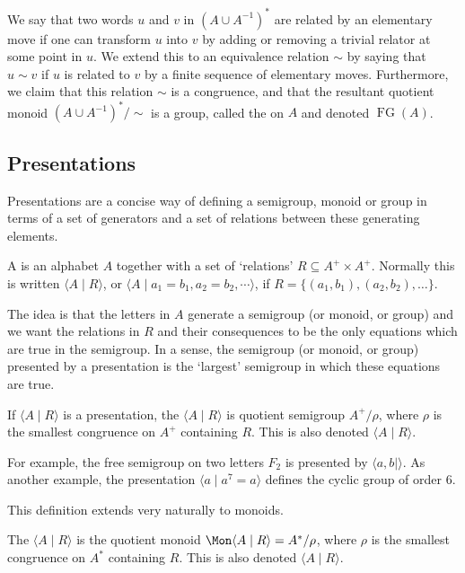\documentclass[showlabels,noindex,12pt]{lmaths}
\DeclareMathOperator{\FG}{FG}
\begin{document}
We say that two words $u$ and $v$ in $(A \cup A^{-1})^*$ are related by an elementary move if one can transform $u$ into $v$ by adding or removing a trivial relator at some point in $u$. We extend this to an equivalence relation $\sim$ by saying that $u \sim v$ if $u$ is related to $v$ by a finite sequence of elementary moves.  Furthermore, we claim that this relation $\sim$ is a congruence, and that the resultant quotient monoid $(A \cup A^{-1})^*/{\sim}$ is a group, called the  on $A$ and denoted $\FG(A)$.

\subsection{Presentations}

Presentations are a concise way of defining a semigroup, monoid or group in terms of a set of generators and a set of relations between these generating elements.

\begin{defn}
	A  is an alphabet $A$ together with a set of `relations' $R \subseteq A^+ \times A^+$. Normally this is written $\langle A \mid R\rangle$, or $\langle A \mid a_1 = b_1, a_2 = b_2, \cdots \rangle$, if $R = \{(a_1, b_1), (a_2, b_2), \ldots\}$.
\end{defn}

The idea is that the letters in $A$ generate a semigroup (or monoid, or group) and we want the relations in $R$ and their consequences to be the only equations which are true in the semigroup. In a sense, the semigroup (or monoid, or group) presented by a presentation is the `largest' semigroup in which these equations are true.

\begin{defn}
	If $\langle A \mid R \rangle$ is a presentation, the  $\langle A \mid R\rangle$ is quotient semigroup $A^+/\rho$, where $\rho$ is the smallest congruence on $A^+$ containing $R$. This is also denoted $\langle A \mid R \rangle$.
\end{defn}

For example, the free semigroup on two letters $F_2$ is presented by $\langle a, b \mid \rangle$. As another example, the presentation $\langle a \mid a^7 = a \rangle$ defines the cyclic group of order 6.

This definition extends very naturally to monoids.

\begin{defn}
	The  $\langle A \mid R\rangle$ is the quotient monoid $\Mon \langle A \mid R\rangle = A^*/\rho$, where $\rho$ is the smallest congruence on $A^*$ containing $R$. This is also denoted $\langle A \mid R \rangle$.
\end{defn}
\end{document}
